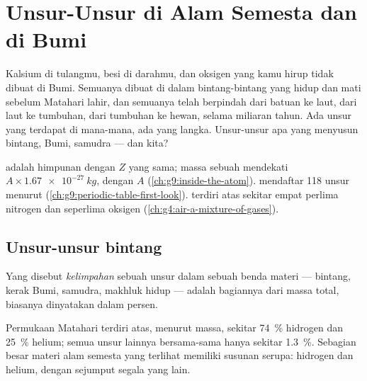 \chapter{Unsur-Unsur di Alam Semesta dan di Bumi}\label{ch:g9:elements-universe-earth}

Kalsium di tulangmu, besi di darahmu, dan oksigen yang kamu hirup tidak
dibuat di Bumi. Semuanya dibuat di dalam bintang-bintang yang hidup dan
mati sebelum Matahari lahir, dan semuanya telah berpindah dari batuan ke
laut, dari laut ke tumbuhan, dari tumbuhan ke hewan, selama miliaran
tahun. Ada unsur yang terdapat di mana-mana, ada yang langka. Unsur-unsur
apa yang menyusun bintang, Bumi, samudra --- dan kita?

\begin{recall}
 adalah himpunan  dengan  $Z$ yang sama; massa
sebuah  mendekati $A \times \qty{1.67e-27}{kg}$, dengan $A$  (\cref{ch:g9:inside-the-atom}).  mendaftar 118
unsur menurut  (\cref{ch:g9:periodic-table-first-look}).
 terdiri atas sekitar empat perlima nitrogen dan seperlima oksigen
(\cref{ch:g4:air-a-mixture-of-gases}).
\end{recall}

\section{Unsur-unsur bintang}

\begin{definition}[Kelimpahan]\label{def:g9:elements-universe-earth:abundance}
Yang disebut \emph{kelimpahan} sebuah unsur dalam
sebuah benda materi --- bintang, kerak Bumi, samudra, makhluk hidup ---
adalah bagiannya dari massa total, biasanya dinyatakan dalam persen.
\end{definition}

\begin{proposition}\label{prop:g9:elements-universe-earth:sun}
Permukaan Matahari terdiri atas, menurut massa, sekitar
\qty{74}{\percent} hidrogen dan \qty{25}{\percent} helium; semua unsur
lainnya bersama-sama hanya sekitar \qty{1.3}{\percent}. Sebagian besar
materi alam semesta yang terlihat memiliki susunan serupa: hidrogen dan
helium, dengan sejumput segala yang lain.
\end{proposition}


